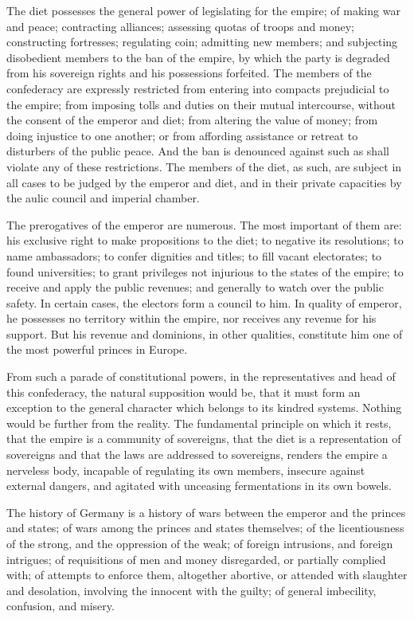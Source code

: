 The diet possesses the general power of legislating for the empire; of making war and peace; contracting alliances; assessing quotas of troops and money; constructing fortresses; regulating coin; admitting new members; and subjecting disobedient members to the ban of the empire, by which the party is degraded from his sovereign rights and his possessions forfeited. The members of the confederacy are expressly restricted from entering into compacts prejudicial to the empire; from imposing tolls and duties on their mutual intercourse, without the consent of the emperor and diet; from altering the value of money; from doing injustice to one another; or from affording assistance or retreat to disturbers of the public peace. And the ban is denounced against such as shall violate any of these restrictions. The members of the diet, as such, are subject in all cases to be judged by the emperor and diet, and in their private capacities by the aulic council and imperial chamber.

The prerogatives of the emperor are numerous. The most important of them are: his exclusive right to make propositions to the diet; to negative its resolutions; to name ambassadors; to confer dignities and titles; to fill vacant electorates; to found universities; to grant privileges not injurious to the states of the empire; to receive and apply the public revenues; and generally to watch over the public safety. In certain cases, the electors form a council to him. In quality of emperor, he possesses no territory within the empire, nor receives any revenue for his support. But his revenue and dominions, in other qualities, constitute him one of the most powerful princes in Europe.

From such a parade of constitutional powers, in the representatives and head of this confederacy, the natural supposition would be, that it must form an exception to the general character which belongs to its kindred systems. Nothing would be further from the reality. The fundamental principle on which it rests, that the empire is a community of sovereigns, that the diet is a representation of sovereigns and that the laws are addressed to sovereigns, renders the empire a nerveless body, incapable of regulating its own members, insecure against external dangers, and agitated with unceasing fermentations in its own bowels.

The history of Germany is a history of wars between the emperor and the princes and states; of wars among the princes and states themselves; of the licentiousness of the strong, and the oppression of the weak; of foreign intrusions, and foreign intrigues; of requisitions of men and money disregarded, or partially complied with; of attempts to enforce them, altogether abortive, or attended with slaughter and desolation, involving the innocent with the guilty; of general imbecility, confusion, and misery.

